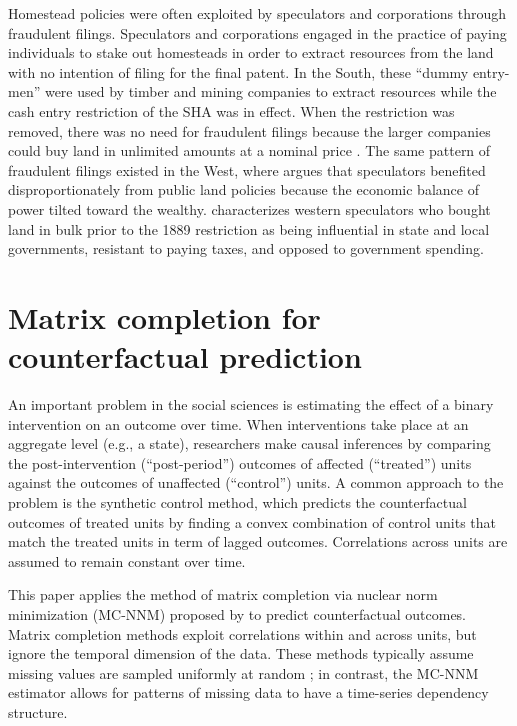Homestead policies were often exploited by speculators and corporations through fraudulent filings. Speculators and corporations engaged in the practice of paying individuals to stake out homesteads in order to extract resources from the land with no intention of filing for the final patent. In the South, these ``dummy entry-men'' were used by timber and mining companies to extract resources while the cash entry restriction of the SHA was in effect. When the restriction was removed, there was no need for fraudulent filings because the larger companies could buy land in unlimited amounts at a nominal price \citep{gates1940federal, gates1979federal}. The same pattern of fraudulent filings existed in the West, where \citet{murtazashvili2013political} argues that speculators benefited disproportionately from public land policies because the economic balance of power tilted toward the wealthy. \citet{gates1942role} characterizes western speculators who bought land in bulk prior to the 1889 restriction as being influential in state and local governments, resistant to paying taxes, and opposed to government spending. 

\section{Matrix completion for counterfactual prediction} \label{estimation}

An important problem in the social sciences is estimating the effect of a binary intervention on an outcome over time. When interventions take place at an aggregate level (e.g., a state), researchers make causal inferences by comparing the post-intervention (``post-period'') outcomes of affected (``treated'') units against the outcomes of unaffected  (``control'') units. A common approach to the problem is the synthetic control method, which predicts the counterfactual outcomes of treated units by finding a convex combination of control units that match the treated units in term of lagged outcomes. Correlations across units are assumed to remain constant over time. 

This paper applies the method of matrix completion via nuclear norm minimization (MC-NNM) proposed by \citet{athey2017matrix} to predict counterfactual outcomes. Matrix completion methods \citep[e.g.,][]{mazumder2010spectral} exploit correlations within and across units, but ignore the temporal dimension of the data. These methods typically assume missing values are sampled uniformly at random \citep{yoon2018estimating}; in contrast, the MC-NNM estimator allows for patterns of missing data to have a time-series dependency structure. 

